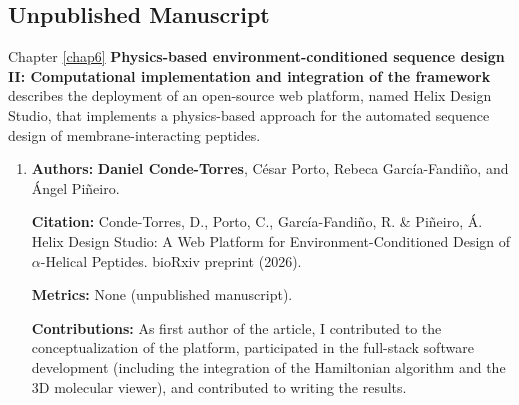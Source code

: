 \subsection*{\Large Unpublished Manuscript}  \vspace{0.2cm}
Chapter \ref{chap6} \textbf{Physics-based environment-conditioned sequence design II: Computational implementation and integration of the framework} describes the deployment of an open-source web platform, named Helix Design Studio, that implements a physics-based approach for the automated sequence design of membrane-interacting peptides.

\begin{enumerate}
 
    \item \textbf{Authors:} \textbf{Daniel Conde-Torres}, César Porto, Rebeca García-Fandiño, and Ángel Piñeiro.

    \textbf{Citation:} Conde-Torres, D., Porto, C., García-Fandiño, R. \& Piñeiro, Á. Helix Design Studio: A Web Platform for Environment-Conditioned Design of $\alpha$-Helical Peptides. bioRxiv preprint (2026).

    \textbf{Metrics:} None (unpublished manuscript).

    \textbf{Contributions:} As first author of the article, I contributed to the conceptualization of the platform, participated in the full-stack software development (including the integration of the Hamiltonian algorithm and the 3D molecular viewer), and contributed to writing the results.
\end{enumerate}
